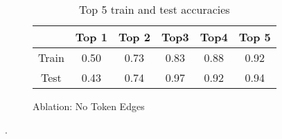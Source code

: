 \begin{table}
  \medskip

  \begin{subfigure}{\linewidth}
    \centering
    \begin{tabular}{c|ccccc}
      & Top 1 & Top 2 & Top3 & Top4 & Top 5 \\
      \hline
      Train & 0.50 & 0.73 & 0.83 & 0.88 & 0.92 \\
      Test & 0.43 & 0.74 & 0.97 & 0.92 & 0.94
      \end{tabular}
      \caption{Ablation: No Token Edges}\label{tab:results:token}
  \end{subfigure}
  \caption{Top 5 train and test accuracies}
  \label{tab:results}.
\end{table}